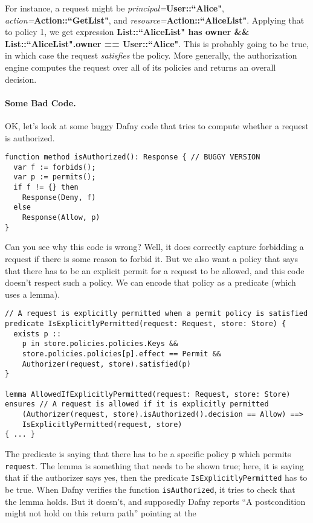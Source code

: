 \documentclass[11pt]{article}
\begin{document}
For instance, a request might be \textit{principal=}\textbf{User::``Alice"}, \textit{action=}\textbf{Action::``GetList"}, and \textit{resource=}\textbf{Action::``AliceList"}. Applying that to policy 1, we get expression \textbf{List::``AliceList" has owner \&\& List::``AliceList".owner == User::``Alice"}. This is probably going to be true, in which case the request \emph{satisfies} the policy. More generally, the authorization engine computes the request over all of its policies and returns an overall decision.

\paragraph{Some Bad Code.} OK, let's look at some buggy Dafny code that tries to compute whether a request is authorized.
\begin{lstlisting}[language=dafny]
function method isAuthorized(): Response { // BUGGY VERSION
  var f := forbids();
  var p := permits();
  if f != {} then
    Response(Deny, f)
  else
    Response(Allow, p)
}
\end{lstlisting}
Can you see why this code is wrong? Well, it does correctly capture forbidding a request if there is some reason to forbid it. But we also want a policy that says that there has to be an explicit permit for a request to be allowed, and this code doesn't respect such a policy. We can encode that policy as a predicate (which uses a lemma).
\begin{lstlisting}[language=dafny]
// A request is explicitly permitted when a permit policy is satisfied
predicate IsExplicitlyPermitted(request: Request, store: Store) {
  exists p ::
    p in store.policies.policies.Keys &&
    store.policies.policies[p].effect == Permit &&
    Authorizer(request, store).satisfied(p)
}

lemma AllowedIfExplicitlyPermitted(request: Request, store: Store)
ensures // A request is allowed if it is explicitly permitted
	(Authorizer(request, store).isAuthorized().decision == Allow) ==>
	IsExplicitlyPermitted(request, store)
{ ... }
\end{lstlisting}
The predicate is saying that there has to be a specific policy \texttt{p} which permits \texttt{request}.
The lemma is something that needs to be shown true; here, it is saying that if the authorizer says yes,
then the predicate \texttt{IsExplicitlyPermitted} has to be true. When Dafny verifies the
function \texttt{isAuthorized}, it tries to check that the lemma holds. But it doesn't, and
supposedly Dafny reports ``A postcondition might not hold on this return path'' pointing at the
\end{document}
